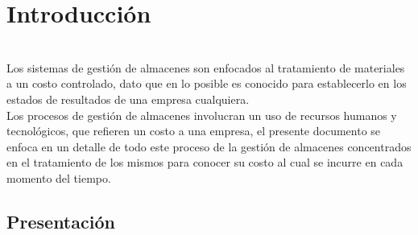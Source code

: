 

\chapter{Introducción}

\\
Los sistemas de gestión de almacenes son enfocados al tratamiento de materiales a un costo controlado, dato que en lo posible es conocido para establecerlo en los estados de resultados de una empresa cualquiera.\\

Los procesos de gestión de almacenes involucran un uso de recursos humanos y tecnológicos, que refieren un costo a una empresa, el presente documento se enfoca en un detalle de todo este proceso de la gestión de almacenes concentrados en el tratamiento de los mismos para conocer su costo al cual se incurre en cada momento del tiempo.\\


\section{Presentación} %

